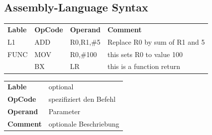 \subsection{Assembly-Language Syntax}
\begin{tabular}{llll}
    \textbf{Lable}  &\textbf{OpCode}  &\textbf{Operand}  & \textbf{Comment} \\ 
    L1& ADD &R0,R1,\#5  & Replace R0 by sum of R1 and 5 \\ 
    FUNC& MOV &R0,\#100  & this sets R0 to value 100 \\  
    &BX&LR& this is a function return\\
\end{tabular} 
\begin{tabular}{|ll}
    \textbf{Lable}& optional  \\ 
    \textbf{OpCode}& spezifiziert den Befehl \\ 
    \textbf{Operand}& Parameter  \\ 
    \textbf{Comment}&  optionale Beschriebung\\ 
\end{tabular} 
\\
